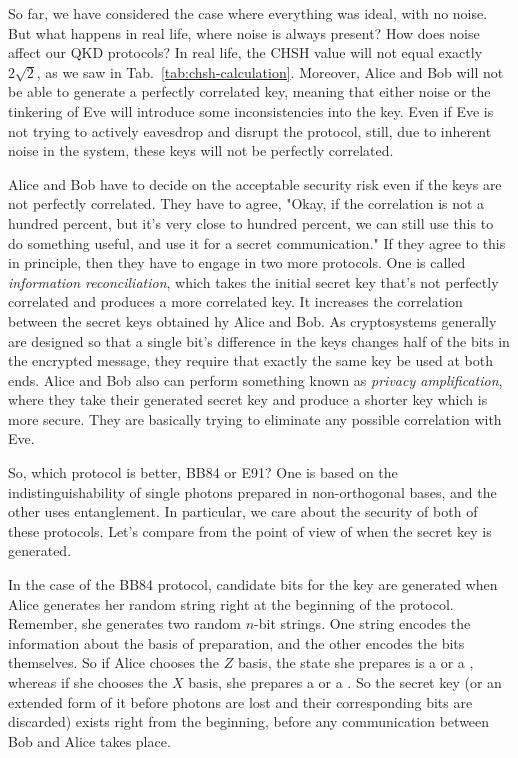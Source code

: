 So far, we have considered the case where everything was ideal, with no noise. But what happens in real life, where noise is always present? How does noise affect our QKD protocols? In real life, the CHSH value will not equal exactly $2\sqrt{2}$, as we saw in Tab.~\ref{tab:chsh-calculation}.  Moreover, Alice and Bob will not be able to generate a perfectly correlated key, meaning that either noise or the tinkering of Eve will introduce some inconsistencies into the key. Even if Eve is not trying to actively eavesdrop and disrupt the protocol, still, due to inherent noise in the system, these keys will not be perfectly correlated.

Alice and Bob have to decide on the acceptable security risk even if the keys are not perfectly correlated. They have to agree, "Okay, if the correlation is not a hundred percent, but it's very close to hundred percent, we can still use this to do something useful, and use it for a secret communication." If they agree to this in principle, then they have to engage in two more protocols. One is called  \emph{information reconciliation}, which takes the initial secret key that's not perfectly correlated and produces a more correlated key.  It increases the correlation between the secret keys obtained hy Alice and Bob.  As cryptosystems generally are designed so that a single bit's difference in the keys changes half of the bits in the encrypted message, they require that exactly the same key be used at both ends.  Alice and Bob also can perform something known as \emph{privacy amplification}, where they take their generated secret key and produce a shorter key which is more secure. They are basically trying to eliminate any possible correlation with Eve.

So, which protocol is better, BB84 or E91? One is based on the indistinguishability of single photons prepared in non-orthogonal bases, and the other uses entanglement. In particular, we care about the security of both of these protocols. Let's compare from the point of view of when the secret key is generated.

In the case of the BB84 protocol, candidate bits for the key are generated when Alice generates her random string right at the beginning of the protocol. Remember, she generates two random $n$-bit strings. One string encodes the information about the basis of preparation, and the other encodes the bits themselves. So if Alice chooses the $Z$ basis, the state she prepares is a  or a , whereas if she chooses the $X$ basis, she prepares a \ket{+} or a \ket{-}. So the secret key (or an extended form of it before photons are lost and their corresponding bits are discarded) exists right from the beginning, before any communication between Bob and Alice takes place.

